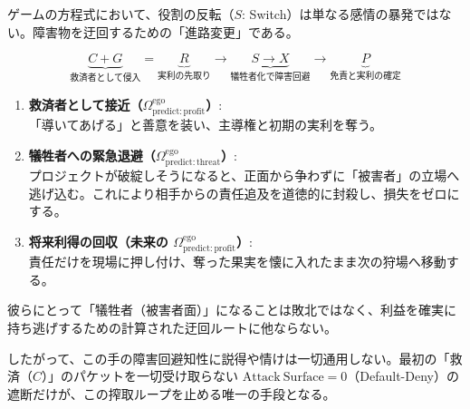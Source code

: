 ゲームの方程式において、役割の反転（$S$: Switch）は単なる感情の暴発ではない。障害物を迂回するための「進路変更」である。

\begin{equation}
    \underbrace{C + G}_{\text{救済者として侵入}} = \underbrace{R}_{\text{実利の先取り}} \to \underbrace{S \to X}_{\text{犠牲者化で障害回避}} \to \underbrace{P}_{\text{免責と実利の確定}}
\end{equation}

\begin{enumerate}
    \item \textbf{救済者として接近（$\Omega^{\mathrm{ego}}_{\mathrm{predict:profit}}$）}:\\
    「導いてあげる」と善意を装い、主導権と初期の実利を奪う。
    \item \textbf{犠牲者への緊急退避（$\Omega^{\mathrm{ego}}_{\mathrm{predict:threat}}$）}:\\
    プロジェクトが破綻しそうになると、正面から争わずに「被害者」の立場へ逃げ込む。これにより相手からの責任追及を道徳的に封殺し、損失をゼロにする。
    \item \textbf{将来利得の回収（未来の $\Omega^{\mathrm{ego}}_{\mathrm{predict:profit}}$）}:\\
    責任だけを現場に押し付け、奪った果実を懐に入れたまま次の狩場へ移動する。
\end{enumerate}

彼らにとって「犠牲者（被害者面）」になることは敗北ではなく、利益を確実に持ち逃げするための計算された迂回ルートに他ならない。

したがって、この手の障害回避知性に説得や情けは一切通用しない。最初の「救済（$C$）」のパケットを一切受け取らない $\mathrm{Attack\ Surface} = 0$（Default-Deny）の遮断だけが、この搾取ループを止める唯一の手段となる。
